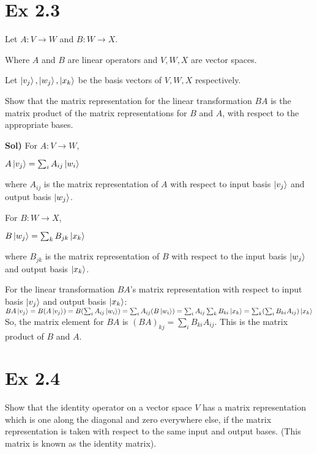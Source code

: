 \documentclass{article}
\newcommand{\0}{{$|0\rangle$}}
\newcommand{\1}{{$|1\rangle$}}
\begin{document}
\section*{Ex 2.3}

Let $A: V \to W$ and $B: W \to X$. 

Where $A$ and $B$ are linear operators and $V, W, X$ are vector spaces. 

Let $\ket{v_j}, \ket{w_j}, \ket{x_k}$ be the basis vectors of $V, W, X$ respectively. 

Show that the matrix representation for the linear transformation $BA$ is the matrix product of the matrix representations for $B$ and $A$, with respect to the appropriate bases. 


\textbf{Sol)} For $A: V \to W$, 

$A\ket{v_j} = \sum_i A_{ij}\ket{w_i}$ 

where $A_{ij}$ is the matrix representation of $A$ with respect to input basis $\ket{v_j}$ and output basis $\ket{w_j}$. 

For $B: W \to X$, 

$B\ket{w_j} = \sum_k B_{jk}\ket{x_k}$ 

where $B_{jk}$ is the matrix representation of $B$ with respect to the input basis $\ket{w_j}$ and output basis $\ket{x_k}$. 


For the linear transformation $BA$'s matrix representation with respect to input basis $\ket{v_j}$ and output basis $\ket{x_k}$: \\
$BA\ket{v_j} = B(A\ket{v_j}) = B(\sum_i A_{ij}\ket{w_i}) = \sum_i A_{ij}(B\ket{w_i}) = \sum_i A_{ij}\sum_k B_{ki}\ket{x_k} = \sum_k (\sum_i B_{ki}A_{ij})\ket{x_k}$ \\
So, the matrix element for $BA$ is $(BA)_{kj} = \sum_i B_{ki}A_{ij}$. This is the matrix product of $B$ and $A$.

\newpage

\section*{Ex 2.4}

Show that the identity operator on a vector space $V$ has a matrix representation which is one along the diagonal and zero everywhere else, if the matrix representation is taken with respect to the same input and output bases. (This matrix is known as the identity matrix).
\end{document}
